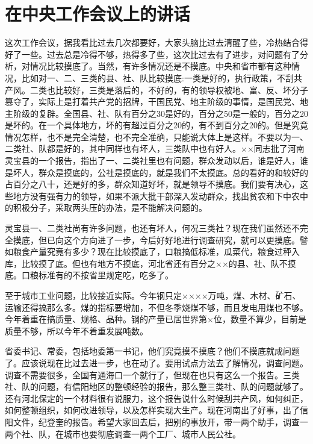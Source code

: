 \section[在中央工作会议上的讲话（一九六一年一月十三日）]{在中央工作会议上的讲话}

这次工作会议，据我看比过去几次都要好，大家头脑比过去清醒了些，冷热结合得好了一些。过去总是冷得不够，热得多了些，这次比过去有了进步，对问题有了分析，对情况比较摸底了。当然，有许多情况还是不摸底。中央和省市都有这种情况，比如对一、二、三类的县、社、队比较摸底:一类是好的，执行政策，不刮共产风。二类也比较好，三类是落后的，不好的，有的领导权被地、富、反、坏分子篡夺了，实际上是打着共产党的招牌，干国民党、地主阶级的事情，是国民党、地主阶级的复辟。全国县、社、队有百分之30是好的，百分之50是一般的，百分之20是坏的。在一个具体地方，坏的有超过百分之20的，有不到百分之20的。但是究竟情况怎样，也不是完全清楚，也不完全准确，只能说大体上是这样。不要以为一、二类社、队都是好的，其中同样也有坏人，三类队中也有好人。××同志批了河南灵宝县的一个报告，指出了一、二类社里也有问题，群众发动以后，谁是好人，谁是坏人，群众是摸底的，公社是摸底的，就是我们不太摸底。总的看好的和较好的占百分之八十，还是好的多，群众知道好坏，就是领导不摸底。我们要有决心，这些地方没有强有力的领导，如果不派大批干部深入发动群众，找出贫农和下中农中的积极分子，采取两头压的办法，是不能解决问题的。

灵宝县一、二类社尚有许多问题，也还有坏人，何况三类社？现在我们虽然还不完全摸底，但已向这个方向进了一步，今后好好地进行调查研究，就可以更摸底。譬如粮食产量究竟有多少？现在比较摸底了，口粮搞低标准，瓜菜代，粮食过秤入库，比较摸了底。但也有地方不摸底，河北省还有百分之××的县、社、队不摸底。口粮标准有的不按省里规定吃，吃多了。

至于城市工业问题，比较接近实际。今年钢只定××××万吨，煤、木材、矿石、运输还得搞那么多。煤的指标要增加，不但冬季烧煤不够，而且发电用煤也不够。今年着重在搞质量、规格、品种。钢的产量已居世界第×位，数量不算少，目前是质量不够，所以今年不着重发展吨数。

省委书记、常委，包括地委第一书记，他们究竟摸不摸底？他们不摸底就成问题了。应该说现在比过去进一步，也在动了。要用试点方法去了解情况，调查问题。调查不需要很多，全国有通海口一个就行了，但现在也只有这么一个报告。三类社、队的问题，有信阳地区的整顿经验的报告，那么整三类社、队的问题就够了。还有河北保定的一个材料很有说服力，这个报告说什么时候刮共产风，如何纠正，如何整顿组织，如何改进领导，以及怎样实现大生产。现在河南出了好事，出了信阳文件，纪登奎的报告。希望大家回去后，把别的事放开，带一两个助手，调查一两个社、队，在城市也要彻底调查一两个工厂、城市人民公社。

